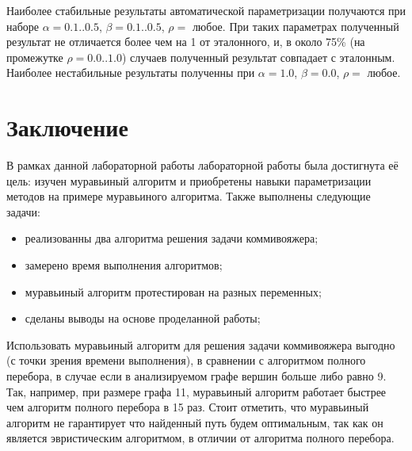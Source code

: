 \documentclass[12pt]{report}
\begin{document}
Наиболее стабильные результаты автоматической параметризации получаются при наборе $\alpha = 0.1..0.5$, $\beta = 0.1..0.5$, $\rho = $ любое. При таких параметрах полученный результат не отличается более чем на 1 от эталонного, и, в около 75\% (на промежутке $\rho = 0.0..1.0$) случаев полученный результат совпадает с эталонным. Наиболее нестабильные результаты полученны при $\alpha = 1.0$, $\beta = 0.0$, $\rho = $ любое.

\chapter*{Заключение}
	
В рамках данной лабораторной работы лабораторной работы была достигнута её цель: изучен муравьиный алгоритм и приобретены навыки параметризации методов на примере муравьиного алгоритма. Также выполнены следующие задачи:
	
\begin{itemize}
	\item реализованны два алгоритма решения задачи коммивояжера;
	\item замерено время выполнения алгоритмов;
	\item муравьиный алгоритм протестирован на разных переменных;
	\item сделаны выводы на основе проделанной работы;
\end{itemize}

Использовать муравьиный алгоритм для решения задачи коммивояжера выгодно (с точки зрения времени выполнения), в сравнении с алгоритмом полного перебора, в случае если в анализируемом графе вершин больше либо равно 9. Так, например, при размере графа 11, муравьиный алгоритм работает быстрее чем алгоритм полного перебора в 15 раз. Стоит отметить, что муравьиный алгоритм не гарантирует что найденный путь будем оптимальным, так как он является эвристическим алгоритмом, в отличии от алгоритма полного перебора.

	
\end{document}
